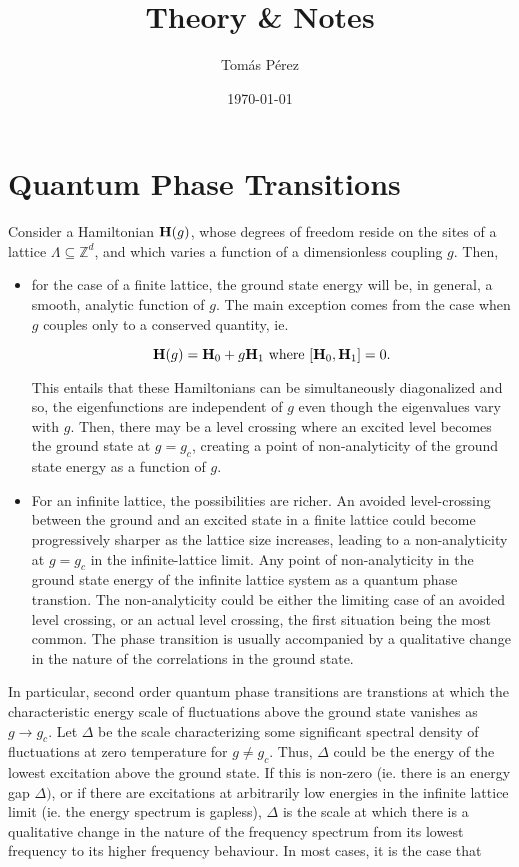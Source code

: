 \documentclass{homework}
\author{Tomás Pérez}
\date{\today}
\title{Theory \& Notes}
\begin{document}
 \maketitle


\section{Quantum Phase Transitions}

Consider a Hamiltonian ${\bf H}(g)$, whose degrees of freedom reside on the sites of a lattice $\Lambda \subseteq \mathds{Z}^d$, and which varies a function of a dimensionless coupling $g$. Then,

\begin{itemize}
    \item for the case of a finite lattice, the ground state energy will be, in general, a smooth, analytic function of $g$. The main exception comes from the case when $g$ couples only to a conserved quantity, ie.
    
    $$
        {\bf H}(g) = {\bf H}_0 + g {\bf H}_1 \textnormal{ where } [{\bf H}_0, {\bf H}_1] = 0.  
    $$
    
    This entails that these Hamiltonians can be simultaneously diagonalized and so, the eigenfunctions are independent of $g$ even though the eigenvalues vary with $g$. Then, there may be a level crossing where an excited level becomes the ground state at $g = g_c$, creating a point of non-analyticity of the ground state energy as a function of $g$. \\
    
    \item For an infinite lattice, the possibilities are richer. An avoided level-crossing between the ground and an excited state in a finite lattice could become progressively sharper as the lattice size increases, leading to a non-analyticity at $g = g_c$ in the infinite-lattice limit. Any point of non-analyticity in the ground state energy of the infinite lattice system as a quantum phase transtion. The non-analyticity could be either the limiting case of an avoided level crossing, or an actual level crossing, the first situation being the most common. The phase transition is usually accompanied by a qualitative change in the nature of the correlations in the ground state. \\
\end{itemize}

In particular, second order quantum phase transitions are transtions at which the characteristic energy scale of fluctuations above the ground state vanishes as $g \rightarrow g_c$. Let $\Delta$ be the scale characterizing some significant spectral density of fluctuations at zero temperature for $g \neq g_c$. Thus, $\Delta$ could be the energy of the lowest excitation above the ground state. If this is non-zero (ie. there is an energy gap $\Delta)$, or if there are excitations at arbitrarily low energies in the infinite lattice limit (ie. the energy spectrum is gapless), $\Delta$ is the scale at which there is a qualitative change in the nature of the frequency spectrum from its lowest frequency to its higher frequency behaviour. In most cases, it is the case that 
\end{document}
